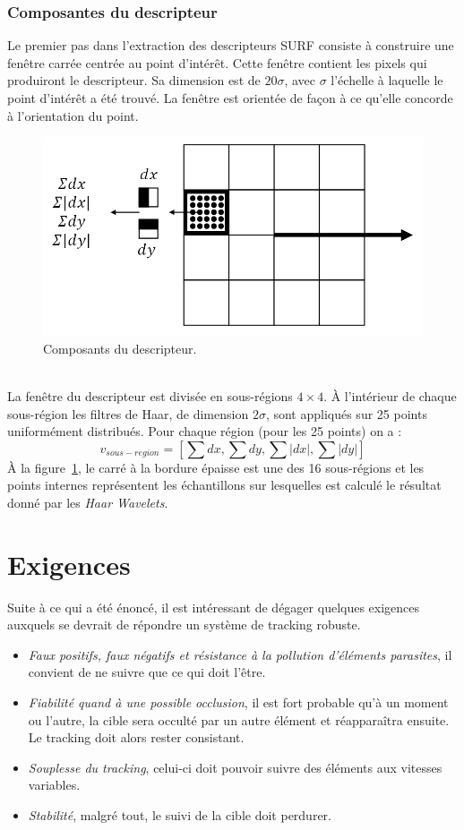 \documentclass[a4paper,11pt]{report}
\begin{document}
\subsubsection{Composantes du descripteur}
Le premier pas dans l'extraction des descripteurs SURF consiste à construire une fenêtre carrée centrée au point d'intérêt. Cette fenêtre contient les pixels qui produiront le descripteur. Sa dimension est de $20\sigma$, avec $\sigma$ l'échelle à laquelle le point d'intérêt a été trouvé. La fenêtre est orientée de façon à ce qu'elle concorde à l'orientation du point.
\begin{figure}[ht]
\centering
\includegraphics[scale=0.3]{figure8.png}
\caption{Composants du descripteur.}
\label{fig8}
\end{figure}
\\La fenêtre du descripteur est divisée en sous-régions  $4\times4$. \`A l'intérieur de chaque sous-région les filtres de Haar, de dimension $2\sigma$, sont appliqués sur 25 points uniformément distribués. Pour chaque région (pour les 25 points) on a : 
$$v_{sous-region}= \left[ \sum dx,\sum dy,\sum |dx|,\sum |dy|\right]$$
\`A la figure~\ref{fig8}, le carré à la bordure épaisse est une des 16 sous-régions et les points internes représentent les échantillons sur lesquelles est calculé le résultat donné par les \textit{Haar Wavelets}.

\section{Exigences}
Suite à ce qui a été énoncé, il est intéressant de dégager quelques exigences auxquels se devrait de répondre un système de tracking robuste. 
\begin{itemize}
\item \textit{Faux positifs, faux négatifs et résistance à la pollution d'éléments parasites}, il convient de ne suivre que ce qui doit l'être.
\item \textit{Fiabilité quand à une possible occlusion}, il est fort probable qu'à un moment ou l'autre, la cible sera occulté par un autre élément et réapparaîtra ensuite. Le tracking doit alors rester consistant.
\item \textit{Souplesse du tracking}, celui-ci doit pouvoir suivre des éléments aux vitesses variables.
\item \textit{Stabilité}, malgré tout, le suivi de la cible doit perdurer.
\end{itemize}
\end{document}
